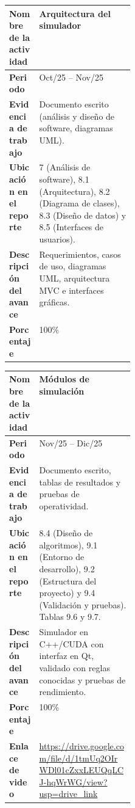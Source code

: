 \documentclass[letterpaper,10pt,oneside]{article}
\begin{document}
	\begin{table}[H]
		\centering
		\renewcommand{\arraystretch}{1.25}
		\begin{tabularx}{\linewidth}{|>{\raggedright\bfseries\arraybackslash}p{0.24\linewidth}|X|}
			\hline
			\rowcolor{encabezado}
			Nombre de la actividad & \textbf{Arquitectura del simulador} \\ \hline
			Periodo & Oct/25 -- Nov/25 \\ \hline
			Evidencia de trabajo & Documento escrito (análisis y diseño de software, diagramas UML). \\ \hline
			Ubicación en el reporte & 7 (Análisis de software), 8.1 (Arquitectura), 8.2 (Diagrama de clases), 8.3 (Diseño de datos) y 8.5 (Interfaces de usuarios). \\ \hline
			Descripción del avance & Requerimientos, casos de uso, diagramas UML, arquitectura MVC e interfaces gráficas. \\ \hline
			Porcentaje & 100\% \\ \hline
		\end{tabularx}
	\end{table}

	\begin{table}[H]
		\centering
		\renewcommand{\arraystretch}{1.25}
		\begin{tabularx}{\linewidth}{|>{\raggedright\bfseries\arraybackslash}p{0.24\linewidth}|X|}
			\hline
			\rowcolor{encabezado}
			Nombre de la actividad & \textbf{Módulos de simulación} \\ \hline
			Periodo & Nov/25 -- Dic/25 \\ \hline
			Evidencia de trabajo & Documento escrito, tablas de resultados y pruebas de operatividad. \\ \hline
			Ubicación en el reporte & 8.4 (Diseño de algoritmos), 9.1 (Entorno de desarrollo), 9.2 (Estructura del proyecto) y 9.4 (Validación y pruebas). Tablas 9.6 y 9.7. \\ \hline
			Descripción del avance & Simulador en C++/CUDA con interfaz en Qt, validado con reglas conocidas y pruebas de rendimiento. \\ \hline
			Porcentaje & 100\% \\ \hline
			Enlace de video & \url{https://drive.google.com/file/d/1tmUq2OIrWDl01cZxxLEUQqLCJ-hqWrWG/view?usp=drive_link} \\ \hline
		\end{tabularx}
	\end{table}
\end{document}
